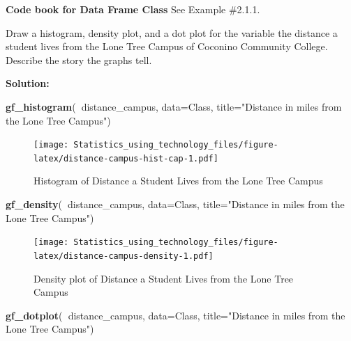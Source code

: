 \documentclass[
]{book}
\newenvironment{Shaded}{\begin{snugshade}}{\end{snugshade}}
\newcommand{\DataTypeTok}[1]{\textcolor[rgb]{0.13,0.29,0.53}{#1}}
\newcommand{\KeywordTok}[1]{\textcolor[rgb]{0.13,0.29,0.53}{\textbf{#1}}}
\newcommand{\NormalTok}[1]{#1}
\newcommand{\OperatorTok}[1]{\textcolor[rgb]{0.81,0.36,0.00}{\textbf{#1}}}
\newcommand{\StringTok}[1]{\textcolor[rgb]{0.31,0.60,0.02}{#1}}
\begin{document}
\textbf{Code book for Data Frame Class} See Example \#2.1.1.

Draw a histogram, density plot, and a dot plot for the variable the distance a student lives from the Lone Tree Campus of Coconino Community College. Describe the story the graphs tell.

\textbf{Solution:}



\begin{Shaded}
\begin{Highlighting}[]
\KeywordTok{gf_histogram}\NormalTok{(}\OperatorTok{~}\NormalTok{distance_campus, }\DataTypeTok{data=}\NormalTok{Class, }\DataTypeTok{title=}\StringTok{"Distance in miles from the Lone Tree Campus"}\NormalTok{)}
\end{Highlighting}
\end{Shaded}

\begin{figure}
\centering
\texttt{[image: Statistics\_using\_technology\_files/figure-latex/distance-campus-hist-cap-1.pdf]}
\caption{\label{fig:distance-campus-hist-cap}Histogram of Distance a Student Lives from the Lone Tree Campus}
\end{figure}



\begin{Shaded}
\begin{Highlighting}[]
\KeywordTok{gf_density}\NormalTok{(}\OperatorTok{~}\NormalTok{distance_campus, }\DataTypeTok{data=}\NormalTok{Class, }\DataTypeTok{title=}\StringTok{"Distance in miles from the Lone Tree Campus"}\NormalTok{)}
\end{Highlighting}
\end{Shaded}

\begin{figure}
\centering
\texttt{[image: Statistics\_using\_technology\_files/figure-latex/distance-campus-density-1.pdf]}
\caption{\label{fig:distance-campus-density}Density plot of Distance a Student Lives from the Lone Tree Campus}
\end{figure}



\begin{Shaded}
\begin{Highlighting}[]
\KeywordTok{gf_dotplot}\NormalTok{(}\OperatorTok{~}\NormalTok{distance_campus, }\DataTypeTok{data=}\NormalTok{Class, }\DataTypeTok{title=}\StringTok{"Distance in miles from the Lone Tree Campus"}\NormalTok{)}
\end{Highlighting}
\end{Shaded}
\end{document}
